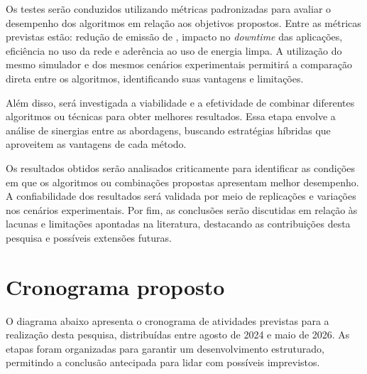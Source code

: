 \documentclass[
	12pt,				%
	oneside,			%
	a4paper,			%
	english,			%
	brazil				%
	]{abntex2ppgsi}
\begin{document}
Os testes serão conduzidos utilizando métricas padronizadas para avaliar o desempenho dos algoritmos em relação aos objetivos propostos. Entre as métricas previstas estão: redução de emissão de , impacto no \textit{downtime} das aplicações, eficiência no uso da rede e aderência ao uso de energia limpa. A utilização do mesmo simulador e dos mesmos cenários experimentais permitirá a comparação direta entre os algoritmos, identificando suas vantagens e limitações.

Além disso, será investigada a viabilidade e a efetividade de combinar diferentes algoritmos ou técnicas para obter melhores resultados. Essa etapa envolve a análise de sinergias entre as abordagens, buscando estratégias híbridas que aproveitem as vantagens de cada método.

Os resultados obtidos serão analisados criticamente para identificar as condições em que os algoritmos ou combinações propostas apresentam melhor desempenho. A confiabilidade dos resultados será validada por meio de replicações e variações nos cenários experimentais. Por fim, as conclusões serão discutidas em relação às lacunas e limitações apontadas na literatura, destacando as contribuições desta pesquisa e possíveis extensões futuras.

\section{Cronograma proposto}
O diagrama abaixo apresenta o cronograma de atividades previstas para a realização desta pesquisa, distribuídas entre agosto de 2024 e maio de 2026. As etapas foram organizadas para garantir um desenvolvimento estruturado, permitindo a conclusão antecipada para lidar com possíveis imprevistos.
\end{document}
